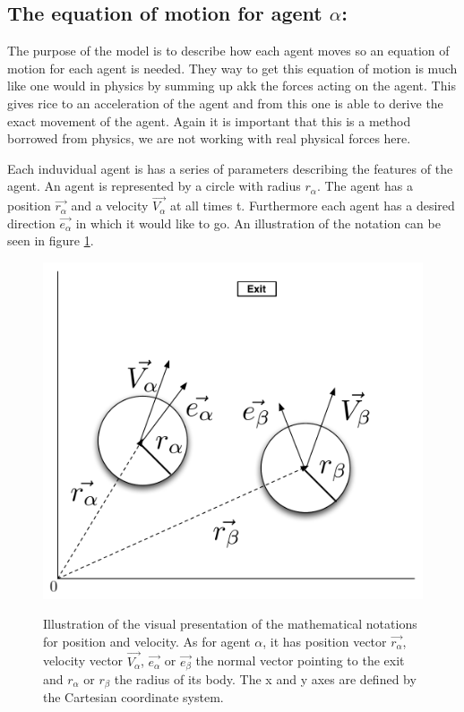 \subsection{The equation of motion for agent $ \alpha $:}
The purpose of the model is to describe how each agent moves so an equation of 
motion for each agent is needed. They way to get this equation of motion is 
much like one would in physics by summing up akk the forces acting on the 
agent. This gives rice to an acceleration of the agent and from this one is 
able to derive the exact movement of the agent. Again it is important that 
this is a method borrowed from physics, we are not working with real physical 
forces here.

Each induvidual agent is has a series of parameters describing the features of 
the agent. An agent is represented by a circle with radius $r_{\alpha}$. The 
agent has a position $\vec{r_{\alpha}}$ and a velocity $\vec{V_{\alpha}}$ at 
all times t. Furthermore each agent has a desired direction $\vec{e_{\alpha}}$ 
in which it would like to go. An illustration of the notation can be seen in 
figure \ref{fig:NotationOfAgent}.

\begin{figure}[hb]
    \centering
    {\includegraphics[scale=0.35]{Figures/NotationOfAgent.pdf}} 
    \caption[Notation of an agent]{Illustration of the visual presentation of 
    the mathematical notations for position and velocity. As for agent $ 
    \alpha $, it has position vector $ \vec{r_{\alpha}} $, velocity vector $ 
    \vec{V_{\alpha}} $, $\vec{e_{\alpha}}$ or $\vec{e_{\beta}}$ the normal 
    vector pointing to the exit and  $ r_{\alpha} $ or  $ r_{\beta} $ the 
    radius of its body.  The x and y axes are defined by the Cartesian 
    coordinate system.}
    \label{fig:NotationOfAgent}
\end{figure}

